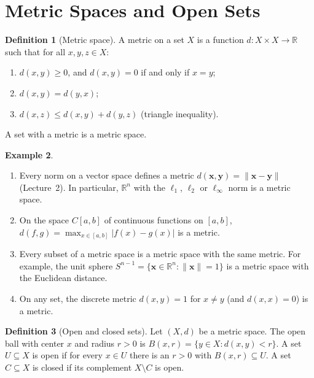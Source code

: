 \documentclass[11pt]{article}
\newcommand{\norm}[1]{\lVert #1 \rVert}
\theoremstyle{definition}
\newtheorem{definition}{Definition}[section]
\newtheorem{example}[definition]{Example}
\theoremstyle{plain}
\theoremstyle{remark}
\begin{document}
\section{Metric Spaces and Open Sets}\label{sec:metric}

\begin{definition}[Metric space]\label{def:metric}
    A metric on a set $X$ is a function $d: X \times X \to \mathbb{R}$ such that for all $x, y, z \in X$:
    \begin{enumerate}
        \item $d(x, y) \geq 0$, and $d(x, y) = 0$ if and only if $x = y$;
        \item $d(x, y) = d(y, x)$;
        \item $d(x, z) \leq d(x, y) + d(y, z)$ (triangle inequality).
    \end{enumerate}
    A set with a metric is a metric space.
\end{definition}

\begin{example}\label{ex:metrics}
    \begin{enumerate}
        \item Every norm on a vector space defines a metric $d(\mathbf{x}, \mathbf{y}) = \norm{\mathbf{x} - \mathbf{y}}$ (Lecture~2). In particular, $\mathbb{R}^n$ with the $\ell_1$, $\ell_2$ or $\ell_\infty$ norm is a metric space.
        \item On the space $C[a, b]$ of continuous functions on $[a, b]$, $d(f, g) = \max_{x \in [a, b]}|f(x) - g(x)|$ is a metric.
        \item Every subset of a metric space is a metric space with the same metric. For example, the unit sphere $S^{n-1} = \{\mathbf{x} \in \mathbb{R}^n : \norm{\mathbf{x}} = 1\}$ is a metric space with the Euclidean distance.
        \item On any set, the discrete metric $d(x, y) = 1$ for $x \neq y$ (and $d(x, x) = 0$) is a metric.
    \end{enumerate}
\end{example}

\begin{definition}[Open and closed sets]\label{def:open-closed}
    Let $(X, d)$ be a metric space. The open ball with center $x$ and radius $r > 0$ is $B(x, r) = \{y \in X : d(x, y) < r\}$. A set $U \subseteq X$ is open if for every $x \in U$ there is an $r > 0$ with $B(x, r) \subseteq U$. A set $C \subseteq X$ is closed if its complement $X \setminus C$ is open.
\end{definition}
\end{document}
